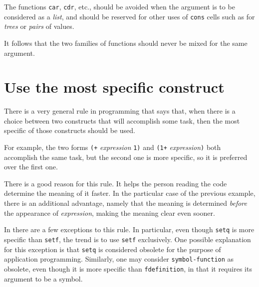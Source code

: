 The functions \texttt{car}, \texttt{cdr}, etc., should be avoided when
the argument is to be considered as a \emph{list}, and should be
reserved for other uses of \texttt{cons} cells such as for
\emph{trees} or \emph{pairs} of values.

It follows that the two families of functions should never be mixed
for the same argument.

\section{Use the most specific construct}

There is a very general rule in programming that says that, when there
is a choice between two constructs that will accomplish some task,
then the most specific of those constructs should be used.

For example, the two forms \texttt{(+} \textit{expression} \texttt{1)}
and \texttt{(1+} \textit{expression}\texttt{)} both accomplish the
same task, but the second one is more specific, so it is preferred over
the first one.

There is a good reason for this rule.  It helps the person reading the
code determine the meaning of it faster.  In the particular case of
the previous example, there is an additional advantage, namely that
the meaning is determined \emph{before} the appearance of
\textit{expression}, making the meaning clear even sooner.

In \commonlisp{} there are a few exceptions to this rule. In
particular, even though \texttt{setq} is more specific than
\texttt{setf}, the trend is to use \texttt{setf} exclusively.  One
possible explanation for this exception is that \texttt{setq} is
considered obsolete for the purpose of application programming.
Similarly, one may consider \texttt{symbol-function} as obsolete, even
though it is more specific than \texttt{fdefinition}, in that it
requires its argument to be a symbol.
